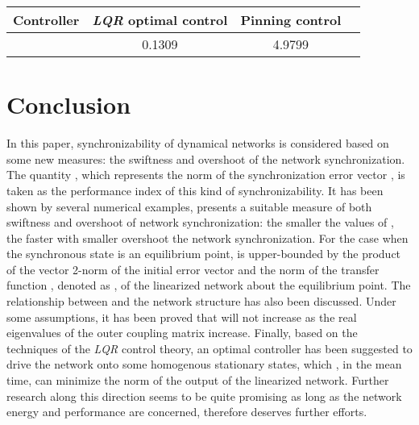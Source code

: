 \documentclass[11pt]{article}
\begin{document}
\begin{center}
\vskip 0.2cm
\begin{tabular}{|c|c|c|c|}\hline
Controller & \textit{LQR} optimal control & Pinning control
\\\hline  & 0.1309 & 4.9799

\\\hline
\end{tabular}
\vskip 0.2cm 
\end{center}
\hfill 

\section{Conclusion}

\quad In this paper, synchronizability of dynamical networks is
considered based on some new measures: the swiftness and overshoot
of the network synchronization. The quantity , which
represents the  norm of the synchronization error vector
, is taken as the performance index of this kind of
synchronizability. It has been shown by several numerical examples,
 presents a suitable measure of both swiftness and
overshoot of network synchronization: the smaller the values of
, the faster with smaller overshoot the network
synchronization. For the case when the synchronous state is an
equilibrium point,  is upper-bounded by the product of the
vector 2-norm of the initial error vector  and the  norm
of the transfer function , denoted as , of the
linearized network about the equilibrium point. The relationship
between  and the network structure has also been
discussed. Under some assumptions, it has been proved that
 will not increase as the real eigenvalues of the outer
coupling matrix increase. Finally, based on the techniques of the
\textit{LQR} control theory, an optimal controller has been
suggested to drive the network onto some homogenous stationary
states, which , in the mean time, can minimize the  norm of the
output of the linearized network. Further research along this
direction seems to be quite promising as long as the network energy
and performance are concerned, therefore deserves further efforts.






\vskip 2mm
\end{document}
